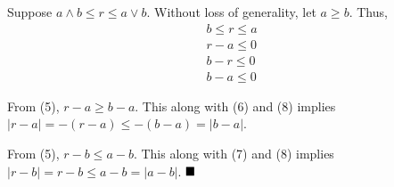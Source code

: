 \documentclass{book}
\begin{document}
Suppose $a \land b \leq r \leq a \lor b$. Without loss of generality, let $a \geq b$. Thus, 
\begin{align}
    b \leq r \leq a
\\  r - a \leq 0
\\  b - r \leq 0
\\  b - a \leq 0
\end{align}

From (5), $r - a \geq b - a$. This along with (6) and (8) implies $|r - a| = -(r - a) \leq -(b - a) = |b - a|$.

From (5), $r - b \leq a - b$. This along with (7) and (8) implies $|r - b| = r - b \leq a - b = |a - b|$.
$\hfill \blacksquare$ \\ \\





\end{document}
